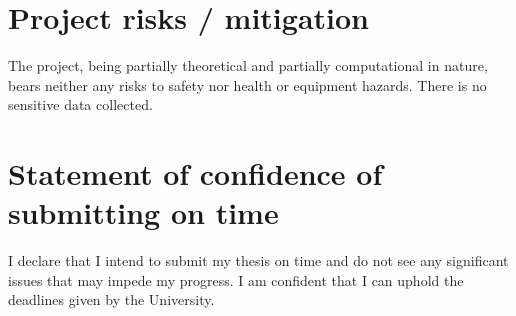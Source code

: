 \documentclass[12pt]{article}
\begin{document}
	\section{Project risks / mitigation}
	
	The project, being partially theoretical and partially computational in nature, bears neither any risks to safety nor health or equipment hazards. There is no sensitive data collected.
	
	\section{Statement of confidence of submitting on time}
	
	I declare that I intend to submit my thesis on time and do not see any significant issues that may impede my progress. I am confident that I can uphold the deadlines given by the University.
	

	
\end{document}
